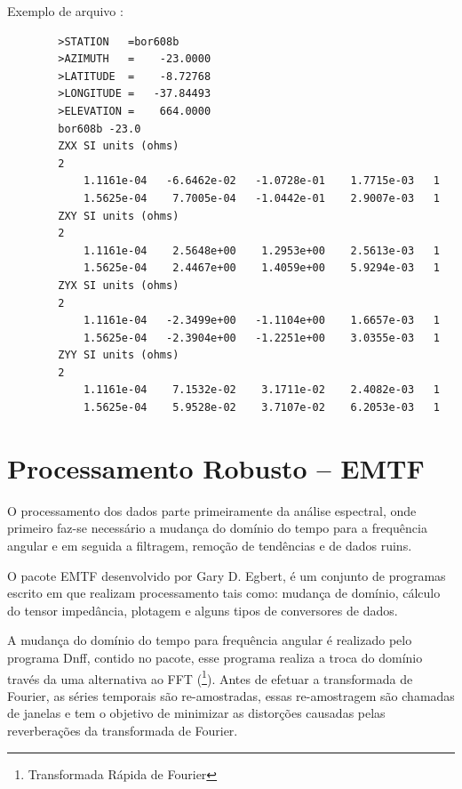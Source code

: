         Exemplo de arquivo :
        
\begin{footnotesize}        
\begin{verbatim}
        >STATION   =bor608b
        >AZIMUTH   =    -23.0000
        >LATITUDE  =    -8.72768
        >LONGITUDE =   -37.84493
        >ELEVATION =    664.0000
        bor608b -23.0
        ZXX SI units (ohms)
        2
            1.1161e-04   -6.6462e-02   -1.0728e-01    1.7715e-03   1
            1.5625e-04    7.7005e-04   -1.0442e-01    2.9007e-03   1
        ZXY SI units (ohms)
        2
            1.1161e-04    2.5648e+00    1.2953e+00    2.5613e-03   1
            1.5625e-04    2.4467e+00    1.4059e+00    5.9294e-03   1
        ZYX SI units (ohms)
        2
            1.1161e-04   -2.3499e+00   -1.1104e+00    1.6657e-03   1
            1.5625e-04   -2.3904e+00   -1.2251e+00    3.0355e-03   1
        ZYY SI units (ohms)
        2
            1.1161e-04    7.1532e-02    3.1711e-02    2.4082e-03   1
            1.5625e-04    5.9528e-02    3.7107e-02    6.2053e-03   1
\end{verbatim}
\end{footnotesize}
    
    \section{Processamento Robusto -- EMTF}
        \label{sec-robusto}
        
            O processamento dos dados parte primeiramente da análise espectral, onde primeiro faz-se necessário a mudança do domínio do tempo para a frequência angular e em seguida a filtragem, remoção de tendências e de dados ruins.
            
            O pacote EMTF \cite{egbert-emtf} desenvolvido por Gary D. Egbert, é um conjunto de programas escrito em  que realizam processamento tais como: mudança de domínio, cálculo do tensor impedância, plotagem e alguns tipos de conversores de dados. 
            
            A mudança do domínio do tempo para frequência angular é realizado pelo programa Dnff, contido no pacote, esse programa realiza a troca do domínio través da   uma alternativa ao FFT (\footnote{Transformada Rápida de Fourier}). Antes de efetuar a transformada de Fourier, as séries temporais são re-amostradas, essas re-amostragem são chamadas de janelas e tem o objetivo de minimizar as distorções causadas pelas reverberações da transformada de Fourier.
            
